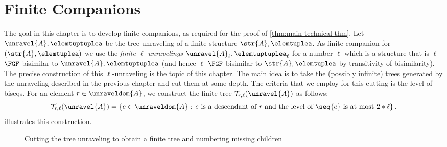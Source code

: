 \chapter{Finite Companions}\label{chap:finite}
The goal in this chapter is to develop finite companions, as required for the proof of \cref{thm:main-technical-thm}.
Let $\unravel{A}, \elemtuptuplea$ be the tree unraveling of a finite structure $\str{A}, \elemtuplea$.
As finite companion for $(\str{A}, \elemtuplea)$ we use the \emph{finite $\ell$-unravelings} $\unravel{A}_{\ell}, \elemtuptuplea_{\ell}$ for a number $\ell$ which is a structure that is $\ell$-$\FGF$-bisimilar to $\unravel{A}, \elemtuptuplea$ (and hence $\ell$-$\FGF$-bisimilar to $\str{A}, \elemtuplea$ by transitivity of bisimilarity).
The precise construction of this $\ell$-unraveling is the topic of this chapter.
The main idea is to take the (possibly infinite) trees generated by the unraveling described in the previous chapter and cut them at some depth.
The criteria that we employ for this cutting is the level of biseqs.
For an element $r \in \unraveldom{A}$, we construct the finite tree $\mathcal{T}_{r,\ell}(\unravel{A})$ as follows:
\begin{equation*}
  \mathcal{T}_{r,\ell}(\unravel{A}) = \left\{ e \in \unraveldom{A}:\, e\ \text{is a descendant of $r$ and the level of $\seq{e}$ is at most $2 * \ell$} \right\}.
\end{equation*}
 illustrates this construction.
\begin{figure}[H]%
  \centering
  
  \caption{Cutting the tree unraveling to obtain a finite tree and numbering missing children}\label{fig:cutting}
\end{figure}%

